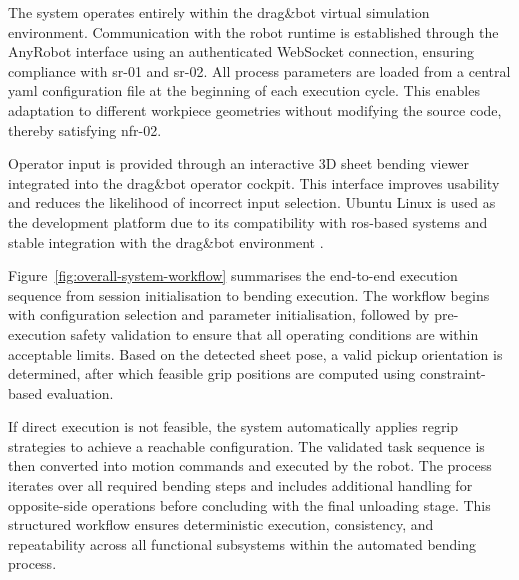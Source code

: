 The system operates entirely within the drag\&bot virtual simulation environment. Communication with the robot runtime is established through the AnyRobot interface using an authenticated WebSocket connection, ensuring compliance with \acs{sr}-01 and \acs{sr}-02. All process parameters are loaded from a central \ac{yaml} configuration file at the beginning of each execution cycle. This enables adaptation to different workpiece geometries without modifying the source code, thereby satisfying \acs{nfr}-02.

Operator input is provided through an interactive 3D sheet bending viewer integrated into the drag\&bot operator cockpit. This interface improves usability and reduces the likelihood of incorrect input selection. Ubuntu Linux is used as the development platform due to its compatibility with \acs{ros}-based systems and stable integration with the drag\&bot environment \cite{quigley2009ros}.

Figure~\ref{fig:overall-system-workflow} summarises the end-to-end execution sequence from session initialisation to bending execution. The workflow begins with configuration selection and parameter initialisation, followed by pre-execution safety validation to ensure that all operating conditions are within acceptable limits. Based on the detected sheet pose, a valid pickup orientation is determined, after which feasible grip positions are computed using constraint-based evaluation.

If direct execution is not feasible, the system automatically applies regrip strategies to achieve a reachable configuration. The validated task sequence is then converted into motion commands and executed by the robot. The process iterates over all required bending steps and includes additional handling for opposite-side operations before concluding with the final unloading stage. This structured workflow ensures deterministic execution, consistency, and repeatability across all functional subsystems within the automated bending process.

